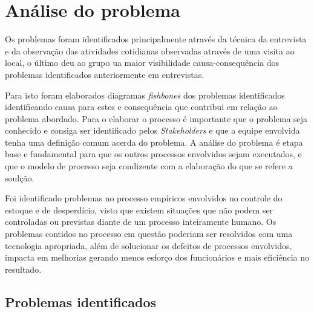 \chapter{Análise do problema}

Os problemas foram identificados principalmente através da técnica da entrevista e da observação das atividades cotidianas observadas através de uma visita ao local, o último deu ao grupo ua maior visibilidade causa-consequência dos problemas identificados anteriormente em entrevistas.

Para isto foram elaborados diagramas \textit{fishbones} dos problemas identificados identificando causa para estes e consequência que contribui em relação ao problema abordado.
Para o elaborar o processo é importante que o problema seja conhecido e consiga ser identificado pelos {\itshape Stakeholders} e que a equipe envolvida tenha uma definição comum acerda do problema. A análise do problema é etapa base e fundamental para que os outros processos envolvidos sejam executados, e que o modelo de processo seja condizente com a elaboração do que se refere a soulção.

Foi identificado problemas no processo empíricos envolvidos no controle do estoque e de desperdício, visto que existem situações que não podem ser controladas ou previstas diante de um processo inteiramente humano. Os problemas contidos no processo em questão poderiam ser resolvidos com uma tecnologia apropriada, além de solucionar os defeitos de processos envolvidos, impacta em melhorias gerando menos esforço dos funcionários e mais eficiência no resultado.

\section{Problemas identificados}

